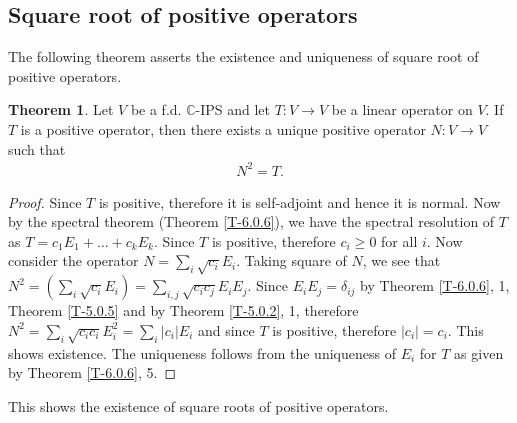 \documentclass[letterpaper,11pt,twoside]{article}
\theoremstyle{definition}
\theoremstyle{definition}
\newtheorem{theorem}[proposition]{Theorem}
\theoremstyle{definition}
\theoremstyle{definition}
\theoremstyle{definition}
\theoremstyle{definition}
\theoremstyle{remark}
\theoremstyle{definition}
\newcommand{\abs}[1]{\left\vert #1 \right \vert}
\newcommand{\C}{\mathbb{C}}
\begin{document}
    \subsection{Square root of positive operators} 
    The following theorem asserts the existence and uniqueness of square root of positive operators.
	\begin{theorem}\label{T-7.1.1}
		Let $ V $ be a f.d. $ \C $-IPS and let $ T:V\to V $ be a linear operator on $ V $. If $ T $ is a positive operator, then there exists a unique positive operator $ N :V\to V$ such that
		\begin{align*}
			N^{2} = T. 
		\end{align*}
	\end{theorem}
	\begin{proof}
		Since $ T $ is positive, therefore it is self-adjoint and hence it is normal. Now by the spectral theorem (Theorem \ref{T-6.0.6}), we have the spectral resolution of $ T $ as $ T = c_1E_1 + \dots + c_kE_k $. Since $ T $ is positive, therefore $ c_i \ge 0 $ for all $ i $. Now consider the operator $ N = \sum_{i}\sqrt{c_i}E_i $. Taking square of $ N $, we see that $ N^{2} = \left (\sum_{i}\sqrt{c_i}E_i\right ) = \sum_{i,j}\sqrt{c_ic_j}E_iE_j $. Since $ E_iE_j =\delta_{ij}$ by Theorem \ref{T-6.0.6}, 1, Theorem \ref{T-5.0.5} and by Theorem \ref{T-5.0.2}, 1, therefore $ N^{2} = \sum_{i}\sqrt{c_ic_i} E_i^{2} = \sum_{i}\abs{c_i} E_i $ and since $ T$ is positive, therefore $ \abs{c_i} = c_i $. This shows existence. The uniqueness follows from the uniqueness of $ E_i $ for $ T $ as given by Theorem \ref{T-6.0.6}, 5. 
	\end{proof}
	This shows the existence of square roots of positive operators.
\end{document}
